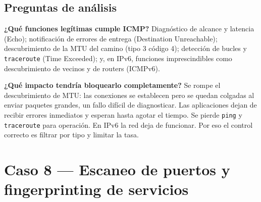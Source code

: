 \subsection{Preguntas de análisis}

\textbf{¿Qué funciones legítimas cumple ICMP?} Diagnóstico de alcance y latencia (Echo); notificación de errores de entrega (Destination Unreachable); descubrimiento de la MTU del camino (tipo 3 código 4); detección de bucles y \texttt{traceroute} (Time Exceeded); y, en IPv6, funciones imprescindibles como descubrimiento de vecinos y de routers (ICMPv6).

\textbf{¿Qué impacto tendría bloquearlo completamente?} Se rompe el descubrimiento de MTU: las conexiones se establecen pero se quedan colgadas al enviar paquetes grandes, un fallo difícil de diagnosticar. Las aplicaciones dejan de recibir errores inmediatos y esperan hasta agotar el tiempo. Se pierde \texttt{ping} y \texttt{traceroute} para operación. En IPv6 la red deja de funcionar. Por eso el control correcto es filtrar por tipo y limitar la tasa.

\section{Caso 8 --- Escaneo de puertos y fingerprinting de servicios}

 

